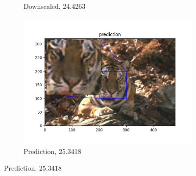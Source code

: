 \documentclass[12pt]{article}
\begin{document}
\begin{figure}[h!]
\begin{subfigure}[b]{0.32\linewidth}
    \caption{Downscaled, 24.4263}
  \end{subfigure}
  \hfill
  \begin{subfigure}[b]{0.32\linewidth}
    \includegraphics[width=\linewidth]{./0-prediction.png}
    \caption{Prediction, 25.3418}
  \end{subfigure}


\end{figure}
\end{document}
